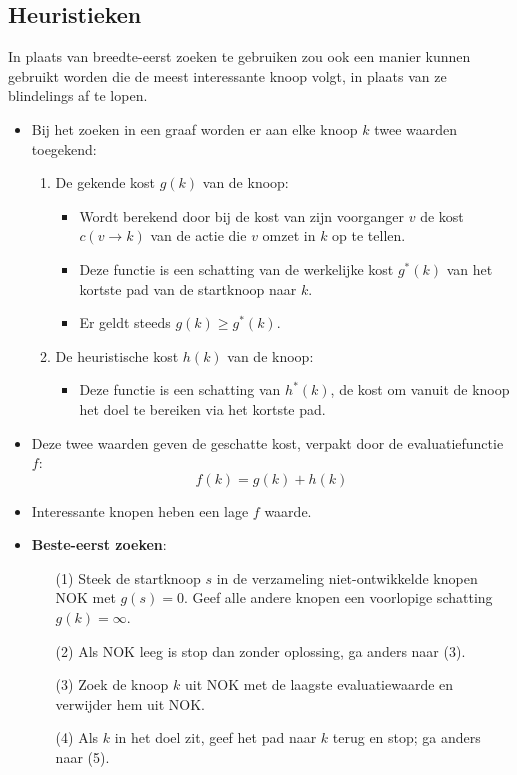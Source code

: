 \subsection{Heuristieken}
In plaats van breedte-eerst zoeken te gebruiken zou ook een manier kunnen gebruikt worden die de meest interessante knoop volgt, in plaats van ze blindelings af te lopen.
\begin{itemize}
	\item Bij het zoeken in een graaf worden er aan elke knoop $k$ twee waarden toegekend:
	\begin{enumerate}
		\item De gekende kost $g(k)$ van de knoop: 
		\begin{itemize}
			\item Wordt berekend door bij de kost van zijn voorganger $v$ de kost $c(v \rightarrow k)$ van de actie die $v$ omzet in $k$ op te tellen.
			\item Deze functie is een schatting van de werkelijke kost $g^*(k)$ van het kortste pad van de startknoop naar $k$.
			\item Er geldt steeds $g(k) \geq g^*(k)$.
		\end{itemize} 
		\item De heuristische kost $h(k)$ van de knoop:
		\begin{itemize}
			\item Deze functie is een schatting van $h^*(k)$, de kost om vanuit de knoop het doel te bereiken via het kortste pad.
		\end{itemize}
	\end{enumerate}
	\item Deze twee waarden geven de geschatte kost, verpakt door de evaluatiefunctie $f$:
	$$f(k) = g(k) + h(k)$$
	\item Interessante knopen heben een lage $f$ waarde. 
	\item \textbf{Beste-eerst zoeken}:
	\begin{enumerate}
		\item[(1)] Steek de startknoop $s$ in de verzameling niet-ontwikkelde knopen NOK met $g(s) = 0$. Geef alle andere knopen een voorlopige schatting $g(k) = \infty$.
		\item[(2)] Als NOK leeg is stop dan zonder oplossing, ga anders naar (3).
		\item[(3)] Zoek de knoop $k$ uit NOK met de laagste evaluatiewaarde en verwijder hem uit NOK.
		\item[(4)] Als $k$ in het doel zit, geef het pad naar $k$ terug en stop; ga anders naar (5).

\end{enumerate}
\end{itemize}
